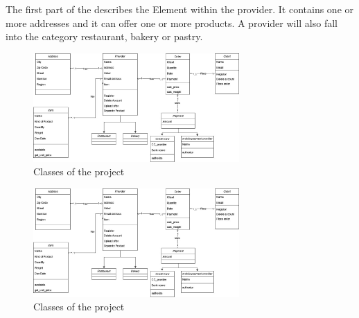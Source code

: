 The first part of the describes the Element within the \gls{provider}. It contains one or more addresses and it 
can offer one or more products. A provider will also fall into the category restaurant, bakery or pastry.

\begin{figure}[H]
    \centering
    \includegraphics[width=0.7\textwidth]{assets/classes_CD.jpg}
    \caption{Classes of the project}
    \label{fig:class_CD}
\end{figure}
 



\begin{figure}[H]
    \centering
    \includegraphics[width=0.7\textwidth]{assets/classes_CD.jpg}
    \caption{Classes of the project}
    \label{fig:class_CD}
\end{figure}
 
